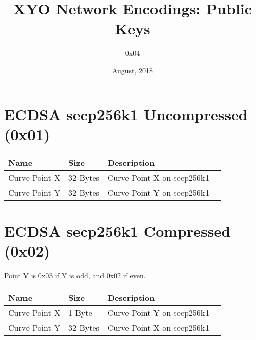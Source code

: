\documentclass[11pt]{article}
\title{XYO Network Encodings: Public Keys}
\author{0x04}
\date{August, 2018}
\begin{document}
\maketitle

\section{ECDSA secp256k1 Uncompressed (0x01)}

\begin{center}
\begin{tabular}{ |l|l|l|l| } 
\hline
\textbf{Name} & \textbf{Size} & \textbf{Description}\\
\hline
Curve Point X & 32 Bytes & Curve Point X on secp256k1\\
Curve Point Y & 32 Bytes & Curve Point Y on secp256k1\\ 
   
\hline
\end{tabular}
\end{center}

\section{ECDSA secp256k1 Compressed (0x02)}
Point Y is 0x03 if Y is odd, and 0x02 if even.

\begin{center}
\begin{tabular}{ |l|l|l|l| } 
\hline
\textbf{Name} & \textbf{Size} & \textbf{Description}\\
\hline
Curve Point X & 1 Byte & Curve Point Y on secp256k1\\
Curve Point Y & 32 Bytes & Curve Point X on secp256k1\\ 
   
\hline
\end{tabular}
\end{center}
\end{document}
